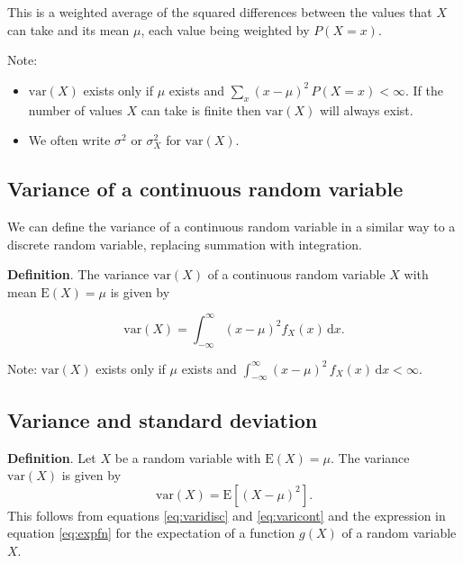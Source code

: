 \documentclass[
  11pt,
  british,
  openany, a4paper]{book}
\providecommand{\tightlist}{%
  \setlength{\itemsep}{0pt}\setlength{\parskip}{0pt}}
\begin{document}
This is a weighted average of the squared differences between the values that \(X\) can take and its mean \(\mu\), each value being weighted by \(P(X=x)\).

Note:

\begin{itemize}
\tightlist
\item
  \(\mathrm{var}(X)\) exists only if \(\mu\) exists and \(\sum_x (x-\mu)^2\,P(X=x) < \infty\). If the number of values \(X\) can take is finite then \(\mathrm{var}(X)\) will always exist.
\item
  We often write \(\sigma^2\) or \(\sigma_X^2\) for \(\mathrm{var}(X)\).
\end{itemize}

\hypertarget{variance-of-a-continuous-random-variable}{%
\subsection{Variance of a continuous random variable}\label{variance-of-a-continuous-random-variable}}

We can define the variance of a continuous random variable in a similar way to a discrete random variable, replacing summation with integration.

\textbf{Definition}. The variance \(\mathrm{var}(X)\) of a continuous random variable \(X\) with mean \(\mathrm{E}(X)=\mu\) is given by

\begin{equation}
\mathrm{var}(X) = \int_{-\infty}^{\infty} (x-\mu)^2 f_X(x) \,\mathrm{d}x. 
\label{eq:varicont}
\end{equation}

Note: \(\mathrm{var}(X)\) exists only if \(\mu\) exists and \(\int_{-\infty}^{\infty} (x-\mu)^2\,f_X(x) \,\mathrm{d}x < \infty\).

\hypertarget{variance-and-standard-deviation}{%
\subsection{Variance and standard deviation}\label{variance-and-standard-deviation}}

\textbf{Definition}. Let \(X\) be a random variable with \(\mathrm{E}(X)=\mu\). The variance \(\mathrm{var}(X)\) is given by
\[ \mathrm{var}(X) = \mathrm{E}\left[(X-\mu)^2\right]. \]
This follows from equations \eqref{eq:varidisc} and \eqref{eq:varicont} and the expression in equation \eqref{eq:expfn} for the expectation of a function \(g(X)\) of a random variable \(X\).
\end{document}
